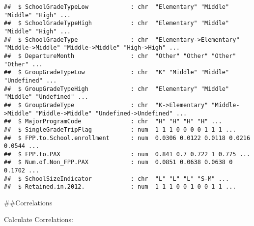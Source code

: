 \documentclass[
]{article}
\begin{document}
\begin{verbatim}
##  $ SchoolGradeTypeLow            : chr  "Elementary" "Middle" "Middle" "High" ...
##  $ SchoolGradeTypeHigh           : chr  "Elementary" "Middle" "Middle" "High" ...
##  $ SchoolGradeType               : chr  "Elementary->Elementary" "Middle->Middle" "Middle->Middle" "High->High" ...
##  $ DepartureMonth                : chr  "Other" "Other" "Other" "Other" ...
##  $ GroupGradeTypeLow             : chr  "K" "Middle" "Middle" "Undefined" ...
##  $ GroupGradeTypeHigh            : chr  "Elementary" "Middle" "Middle" "Undefined" ...
##  $ GroupGradeType                : chr  "K->Elementary" "Middle->Middle" "Middle->Middle" "Undefined->Undefined" ...
##  $ MajorProgramCode              : chr  "H" "H" "H" "H" ...
##  $ SingleGradeTripFlag           : num  1 1 1 0 0 0 0 1 1 1 ...
##  $ FPP.to.School.enrollment      : num  0.0306 0.0122 0.0118 0.0216 0.0544 ...
##  $ FPP.to.PAX                    : num  0.841 0.7 0.722 1 0.775 ...
##  $ Num.of.Non_FPP.PAX            : num  0.0851 0.0638 0.0638 0 0.1702 ...
##  $ SchoolSizeIndicator           : chr  "L" "L" "L" "S-M" ...
##  $ Retained.in.2012.             : num  1 1 1 0 0 1 0 0 1 1 ...
\end{verbatim}

\#\#Correlations

Calculate Correlations:
\end{document}
